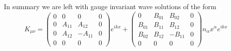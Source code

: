 \documentclass[10pt,letterpaper]{article}
\begin{document}
\\ \\
In summary we are left with gauge invariant wave solutions of the form
\begin{equation}
K_{\mu\nu} = \begin{pmatrix}0&0&0&0\\0&A_{11}&A_{12}&0\\0&A_{12}&-A_{11}&0\\0&0&0&0\end{pmatrix}e^{ikx} + \begin{pmatrix}
0&B_{01}&B_{02}&0\\B_{01}&B_{11}&B_{12}&0\\B_{02}&B_{12}&-B_{11}&0\\0&0&0&0  \end{pmatrix} n_\alpha x^\alpha e^{ikx}
\end{equation}

\end{document}
